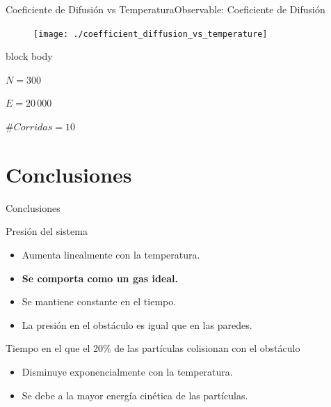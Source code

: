 \documentclass{beamer}
\begin{document}
            \begin{frame}{Coeficiente de Difusión vs Temperatura}{Observable: Coeficiente de Difusión}
                \begin{figure}[H!]
                    \texttt{[image: ./coefficient\_diffusion\_vs\_temperature]}
                    \label{fig:dcm_3}
                \end{figure}
                \begin{beamercolorbox}[sep=5pt,center]{block body}
                    \begin{minipage}[t]{0.3\textwidth}
                        \centering
                        \small{$N=300$}
                    \end{minipage}
                    \hfill
                    \begin{minipage}[t]{0.3\textwidth}
                        \centering
                        \small{$E=20\,000$}
                    \end{minipage}
                    \hfill
                    \begin{minipage}[t]{0.3\textwidth}
                        \centering
                        \small{$\#Corridas = 10$}
                    \end{minipage}
                \end{beamercolorbox}
            \end{frame}

    \section{Conclusiones}

        \begin{frame}{Conclusiones}
            \begin{block}{Presión del sistema}
                \begin{itemize}
                    \item Aumenta linealmente con la temperatura.
                    \item \textbf{Se comporta como un gas ideal.}
                    \item Se mantiene constante en el tiempo.
                    \item La presión en el obstáculo es igual que en las paredes.
                \end{itemize}
            \end{block}
            \begin{block}{Tiempo en el que el 20\% de las partículas colisionan con el obstáculo}
                \begin{itemize}
                    \item Disminuye exponencialmente con la temperatura.
                    \item Se debe a la mayor energía cinética de las partículas.
                \end{itemize}
            \end{block}
        \end{frame}
\end{document}
